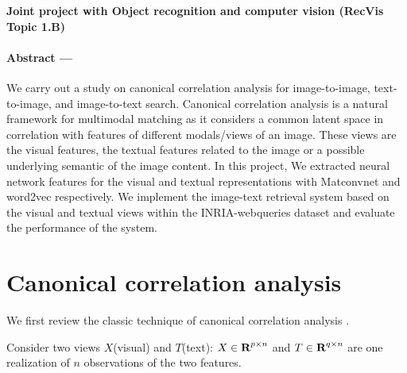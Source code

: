 \documentclass[12pt]{report}	%
\begin{document}
	 
\scribe{}

	
\maketitle


\begin{center}
\textbf{Joint project with Object recognition and computer vision (RecVis Topic 1.B)}%
\end{center}

\paragraph{Abstract  ---} We carry out a study on canonical correlation analysis for image-to-image, text-to-image, and image-to-text search. Canonical correlation analysis is a natural framework for multimodal matching as it considers a common latent space in correlation with features of different modals/views of an image. These views are the visual features, the textual features related to the image or a possible underlying semantic of the image content. In this project, We extracted neural network features for the visual and textual representations with Matconvnet and word2vec respectively. We implement the image-text retrieval system based on the visual and textual views within the INRIA-webqueries dataset and evaluate the performance of the system. %

\section{Canonical correlation analysis} 
We first review the classic technique of canonical correlation analysis \citep{cca1}.

Consider two views $X$(visual) and $T$(text): $X\in {\mbox{\bf R}}^{p\times n}$ and $T\in {\mbox{\bf R}}^{q\times n}$ are one realization of $n$ observations of the two features.
\end{document}

